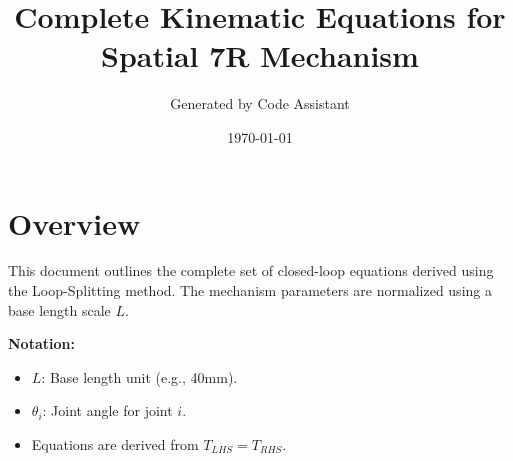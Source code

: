\documentclass[12pt, a4paper]{article}
\title{\textbf{Complete Kinematic Equations for Spatial 7R Mechanism}}
\author{Generated by Code Assistant}
\date{\today}
\begin{document}
\maketitle
\tableofcontents
\newpage

\section{Overview}
This document outlines the complete set of closed-loop equations derived using the Loop-Splitting method. 
The mechanism parameters are normalized using a base length scale $L$.

\textbf{Notation:}
\begin{itemize}
    \item $L$: Base length unit (e.g., 40mm).
    \item $\theta_i$: Joint angle for joint $i$.
    \item Equations are derived from $T_{LHS} = T_{RHS}$.
\end{itemize}
\end{document}
